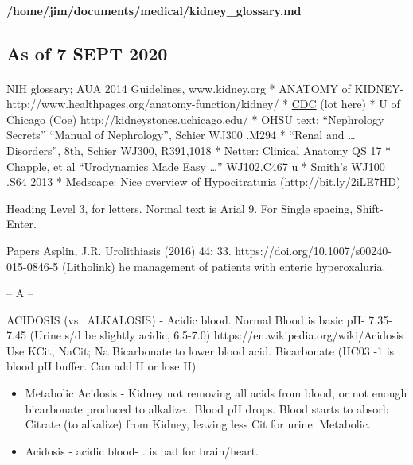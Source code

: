 \hypertarget{homejimdocumentsmedicalkidney_glossary.md}{%
\paragraph{/home/jim/documents/medical/kidney\_glossary.md}\label{homejimdocumentsmedicalkidney_glossary.md}}

\hypertarget{as-of-7-sept-2020}{%
\subsection{As of 7 SEPT 2020}\label{as-of-7-sept-2020}}

\hypertarget{section}{%
\paragraph{}\label{section}}

NIH glossary; AUA 2014 Guidelines, www.kidney.org * ANATOMY of KIDNEY-
http://www.healthpages.org/anatomy-function/kidney/ *
\href{https://www.cdc.gov/diabetes/programs/initiatives/kidney.html}{CDC}
(lot here) * U of Chicago (Coe) http://kidneystones.uchicago.edu/ * OHSU
text: ``Nephrology Secrets'' \textbar{} ``Manual of Nephrology'', Schier
\textbar{} WJ300 .M294 * ``Renal and \ldots{} Disorders'', 8th, Schier
\textbar{} WJ300, R391,1018 * Netter: Clinical Anatomy \textbar{} QS 17
* Chapple, et al ``Urodynamics Made Easy \ldots{}'' \textbar{}
WJ102.C467 u * Smith's \textbar{} WJ100 .S64 2013 * Medscape: Nice
overview of Hypocitraturia (http://bit.ly/2iLE7HD)

Heading Level 3, for letters. Normal text is Arial 9. For Single
spacing, Shift-Enter.

Papers Asplin, J.R. Urolithiasis (2016) 44: 33.
https://doi.org/10.1007/s00240-015-0846-5 (Litholink) he management of
patients with enteric hyperoxaluria.

-- A --

ACIDOSIS (vs.~ALKALOSIS) - Acidic blood. Normal Blood is basic pH-
7.35-7.45 (Urine s/d be slightly acidic, 6.5-7.0)
https://en.wikipedia.org/wiki/Acidosis Use KCit, NaCit; Na Bicarbonate
to lower blood acid. Bicarbonate (HC03 -1 is blood pH buffer. Can add H
or lose H) .

\begin{itemize}
\item
  Metabolic Acidosis - Kidney not removing all acids from blood, or not
  enough bicarbonate produced to alkalize.. Blood pH drops. Blood starts
  to absorb Citrate (to alkalize) from Kidney, leaving less Cit for
  urine. Metabolic.
\item
  Acidosis - acidic blood- . is bad for brain/heart.
\end{itemize}

